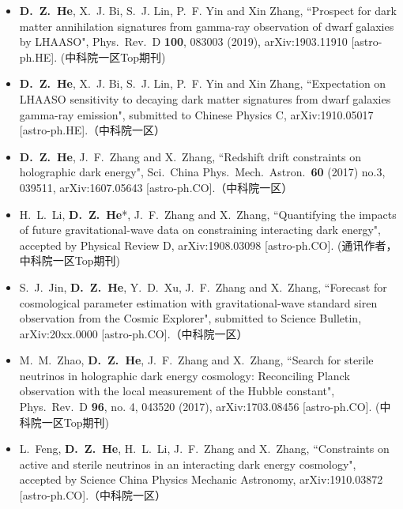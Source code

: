   \begin{itemize}[leftmargin=*]
    
    \item \textbf{D.~Z.~He}, X.~J. Bi, S.~J. Lin, P.~F. Yin and Xin Zhang, ``Prospect for dark matter annihilation signatures from gamma-ray observation of dwarf galaxies by LHAASO", Phys.\ Rev.\ D {\bf 100}, 083003 (2019), arXiv:1903.11910 [astro-ph.HE]. (中科院一区Top期刊)
    
    \item \textbf{D.~Z.~He}, X.~J. Bi, S.~J. Lin, P.~F. Yin and Xin Zhang, ``Expectation on LHAASO sensitivity to decaying dark matter signatures from dwarf galaxies gamma-ray emission", submitted to Chinese Physics C, arXiv:1910.05017 [astro-ph.HE].（中科院一区）
          
    \item \textbf{D.~Z.~He}, J.~F.~Zhang and X.~Zhang, ``Redshift drift constraints on holographic dark energy", Sci.\ China Phys.\ Mech.\ Astron.\  {\bf 60} (2017) no.3, 039511, arXiv:1607.05643 [astro-ph.CO].（中科院一区）

    \item H.~L.~Li, \textbf{D.~Z.~He}*, J.~F.~Zhang and X.~Zhang, ``Quantifying the impacts of future gravitational-wave data on constraining interacting dark energy", accepted by Physical Review D, arXiv:1908.03098 [astro-ph.CO]. (通讯作者，中科院一区Top期刊)

   \item S.~J.~Jin, \textbf{D.~Z.~He}, Y.~D.~Xu, J.~F.~Zhang and X.~Zhang, ``Forecast for cosmological parameter estimation with gravitational-wave standard siren observation from the Cosmic Explorer", submitted to Science Bulletin, arXiv:20xx.0000 [astro-ph.CO].（中科院一区）
   
    \item  M.~M.~Zhao, \textbf{D.~Z.~He}, J.~F.~Zhang and X.~Zhang, ``Search for sterile neutrinos in holographic dark energy cosmology: Reconciling Planck observation with the local measurement of the Hubble constant", Phys.\ Rev.\ D {\bf 96}, no. 4, 043520 (2017), arXiv:1703.08456 [astro-ph.CO]. (中科院一区Top期刊)         

    \item L.~Feng, {\bf D.~Z.~He}, H.~L.~Li, J.~F.~Zhang and X.~Zhang, ``Constraints on active and sterile neutrinos in an interacting dark energy cosmology", accepted by Science China Physics Mechanic Astronomy, arXiv:1910.03872 [astro-ph.CO].（中科院一区）


\end{itemize}
